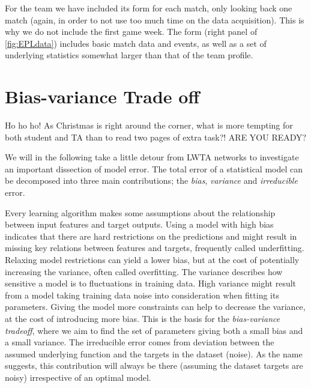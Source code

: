         For the team we have included its form for each match, only looking back one match (again, in order to not use too much time on the data acquisition). This is why we do not include the first game week. The form (right panel of \cref{fig:EPLdata}) includes basic match data and events, as well as a set of underlying statistics somewhat larger than that of the team profile. 
    
    
    \section{Bias-variance Trade off}
        Ho ho ho! As Christmas is right around the corner, what is more tempting for both student and TA than to read two pages of extra task?! ARE YOU READY?

        We will in the following take a little detour from LWTA networks to investigate an important dissection of model error. The total error of a statistical model can be decomposed into three main contributions; the \textit{bias}, \textit{variance} and \textit{irreducible} error.
        
        Every learning algorithm makes some assumptions about the relationship between input features and target outputs. Using a model with high bias indicates that there are hard restrictions on the predictions and might result in missing key relations between features and targets, frequently called underfitting. Relaxing model restrictions can yield a lower bias, but at the cost of potentially increasing the variance, often called overfitting. The variance describes how sensitive a model is to fluctuations in training data. High variance might result from a model taking training data noise into consideration when fitting its parameters. Giving the model more constraints can help to decrease the variance, at the cost of introducing more bias. This is the basis for the \textit{bias-variance tradeoff}, where we aim to find the set of parameters giving both a small bias and a small variance. The irreducible error comes from deviation between the assumed underlying function and the targets in the dataset (noise). As the name suggests, this contribution will always be there (assuming the dataset targets are noisy) irrespective of an optimal model.  
